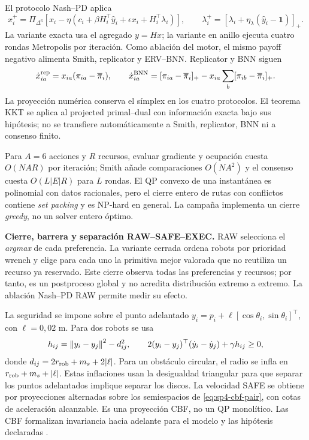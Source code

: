 El protocolo Nash--PD aplica
\begin{equation}
 x_i^{+}=\Pi_{\Delta^6}\!\left[
 x_i-\eta\left(c_i+\beta H_i^\top\widehat y_i+\epsilon x_i+
 H_i^\top\lambda_i\right)\right],\qquad
 \lambda_i^{+}=\left[\lambda_i+\eta_\lambda(\widehat y_i-\mathbf1)\right]_+ .
 \label{eq:sp4-pd}
\end{equation}
La variante exacta usa el agregado $y=Hx$; la variante en anillo ejecuta cuatro
rondas Metropolis por iteraci\'on. Como ablaci\'on del motor, el mismo payoff
negativo alimenta Smith, replicator y ERV--BNN. Replicator y BNN siguen
\begin{equation}
 \dot x_{ia}^{\rm rep}=x_{ia}(\pi_{ia}-\bar\pi_i),\qquad
 \dot x_{ia}^{\rm BNN}=[\pi_{ia}-\bar\pi_i]_+
 -x_{ia}\sum_b[\pi_{ib}-\bar\pi_i]_+ .
 \label{eq:sp4-population}
\end{equation}
La proyecci\'on num\'erica conserva el s\'implex en los cuatro protocolos. El teorema
KKT se aplica al projected primal--dual con informaci\'on exacta bajo sus
hip\'otesis; no se transfiere autom\'aticamente a Smith, replicator, BNN ni a consenso
finito.

Para $A=6$ acciones y $R$ recursos, evaluar gradiente y ocupaci\'on cuesta
$O(NAR)$ por iteraci\'on; Smith a\~nade comparaciones $O(NA^2)$ y el consenso cuesta
$O(L|E|R)$ para $L$ rondas. El QP convexo de una instant\'anea es polinomial con
datos racionales, pero el cierre entero de rutas con conflictos contiene
\emph{set packing} y es NP-hard en general. La campa\~na implementa un cierre
\emph{greedy}, no un solver entero \'optimo.

\medskip
\noindent\textbf{Cierre, barrera y separaci\'on RAW--SAFE--EXEC.}
RAW selecciona el \emph{argmax} de cada preferencia. La variante cerrada ordena
robots por prioridad wrench y elige para cada uno la primitiva mejor valorada que
no reutiliza un recurso ya reservado. Este cierre observa todas las preferencias
y recursos; por tanto, es un postproceso global y no acredita distribuci\'on
extremo a extremo. La ablaci\'on Nash--PD RAW permite medir su efecto.

La seguridad se impone sobre el punto adelantado
$y_i=p_i+\ell[\cos\theta_i,\sin\theta_i]^\top$, con $\ell=0{,}02$ m. Para dos
robots se usa
\begin{equation}
 h_{ij}=\norm{y_i-y_j}^2-d_{ij}^2,\qquad
 2(y_i-y_j)^\top(\dot y_i-\dot y_j)+\gamma h_{ij}\geq0 ,
 \label{eq:sp4-cbf-pair}
\end{equation}
donde $d_{ij}=2r_{\rm rob}+m_s+2|\ell|$. Para un obst\'aculo circular, el radio
se infla en $r_{\rm rob}+m_s+|\ell|$. Estas inflaciones usan la desigualdad
triangular para que separar los puntos adelantados implique separar los discos.
La velocidad SAFE se obtiene por proyecciones alternadas sobre los semiespacios
de \eqref{eq:sp4-cbf-pair}, con cotas de aceleraci\'on alcanzable. Es una
proyecci\'on CBF, no un QP monol\'itico. Las CBF formalizan invariancia hacia
adelante para el modelo y las hip\'otesis declaradas \citep{ames2017cbf}.

